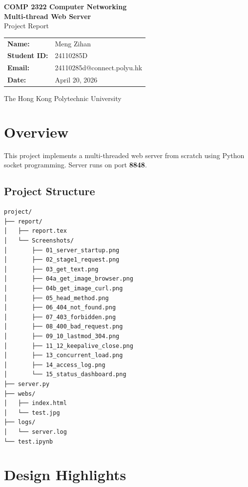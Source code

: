 \documentclass[12pt,a4paper]{article}
\begin{document}
\begin{titlepage}
    \centering
    \vspace*{3cm}
    {\Large \textbf{COMP 2322 Computer Networking}}\\[0.5cm]
    {\LARGE \textbf{Multi-thread Web Server}}\\[0.5cm]
    {\large Project Report}\\[2cm]
    
    \begin{tabular}{ll}
        \textbf{Name:} & Meng Zihan \\
        \textbf{Student ID:} & 24110285D \\
        \textbf{Email:} & 24110285d@connect.polyu.hk \\
        \textbf{Date:} & April 20, 2026 \\
    \end{tabular}
    
    \vfill
    {\small The Hong Kong Polytechnic University}
\end{titlepage}

\tableofcontents
\newpage

\section{Overview}
This project implements a multi-threaded web server from scratch using Python socket programming. Server runs on port \textbf{8848}.

\subsection{Project Structure}
\begin{verbatim}
project/
├── report/
│   ├── report.tex
│   └── Screenshots/
│       ├── 01_server_startup.png
│       ├── 02_stage1_request.png
│       ├── 03_get_text.png
│       ├── 04a_get_image_browser.png
│       ├── 04b_get_image_curl.png
│       ├── 05_head_method.png
│       ├── 06_404_not_found.png
│       ├── 07_403_forbidden.png
│       ├── 08_400_bad_request.png
│       ├── 09_10_lastmod_304.png
│       ├── 11_12_keepalive_close.png
│       ├── 13_concurrent_load.png
│       ├── 14_access_log.png
│       └── 15_status_dashboard.png
├── server.py
├── webs/
│   ├── index.html
│   └── test.jpg
├── logs/
│   └── server.log
└── test.ipynb
\end{verbatim}

\section{Design Highlights}
\end{document}

